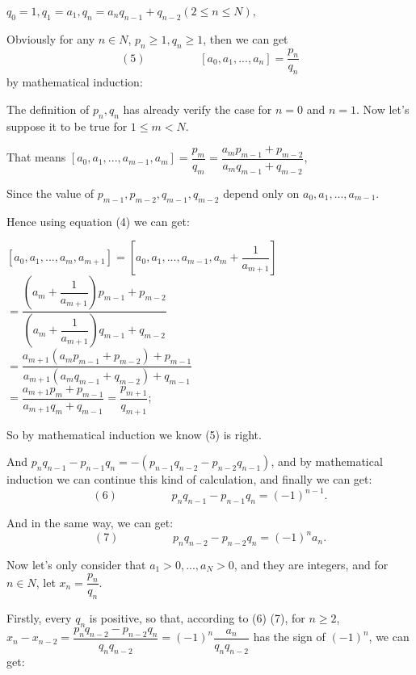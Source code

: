 \documentclass[12pt]{article}
\begin{document}
$q_0=1,q_1=a_1, q_n=a_nq_{n-1}+q_{n-2} (2\leq n\leq N),$\\
\par Obviously for any $n\in N$, $p_n\geq1,q_n\geq1$, then we can get
\begin{equation*}
(5)\hspace{2cm}[a_0,a_1,...,a_n]=\dfrac{p_n}{q_n}
\end{equation*}
by mathematical induction:\\
\par The definition of $p_n,q_n$ has already verify the case for $n=0$ and $n=1$. Now let's suppose it to be true for $1\leq m< N$.\\
\par That means $[a_0,a_1,...,a_{m-1},a_m]=\dfrac{p_m}{q_m}=\dfrac{a_mp_{m-1}+p_{m-2}}{a_mq_{m-1}+q_{m-2}}$,\\
\par Since the value of $p_{m-1},p_{m-2},q_{m-1},q_{m-2}$ depend only on $a_0,a_1,...,a_{m-1}$.\\
\par Hence using equation (4) we can get:
\begin{center}
$[a_0,a_1,...,a_m,a_{m+1}]=[a_0,a_1,...,a_{m-1},a_m+\dfrac{1}{a_{m+1}}]$\\
$=\dfrac{(a_m+\dfrac{1}{a_{m+1}})p_{m-1}+p_{m-2}}{(a_m+\dfrac{1}{a_{m+1}})q_{m-1}+q_{m-2}}$\\
$=\dfrac{a_{m+1}(a_mp_{m-1}+p_{m-2})+p_{m-1}}{a_{m+1}(a_mq_{m-1}+q_{m-2})+q_{m-1}}$\\
$=\dfrac{a_{m+1}p_m+p_{m-1}}{a_{m+1}q_m+q_{m-1}}=\dfrac{p_{m+1}}{q_{m+1}};$\\
\end{center}
So by mathematical induction we know (5) is right.

\par And $p_nq_{n-1}-p_{n-1}q_n=-(p_{n-1}q_{n-2}-p_{n-2}q_{n-1})$, and by mathematical induction we can continue this kind of calculation, and finally we can get:
\begin{equation*}
(6)\hspace{2cm}p_nq_{n-1}-p_{n-1}q_n=(-1)^{n-1}.
\end{equation*}
\par And in the same way, we can get:
\begin{equation*}
(7)\hspace{2cm}p_nq_{n-2}-p_{n-2}q_n=(-1)^na_n.
\end{equation*}
\par Now let's only consider that $a_1>0,...,a_N>0$, and they are integers, and for $n\in N$, let $x_n=\dfrac{p_n}{q_n}$.
\par Firstly, every $q_n$ is positive, so that, according to (6) (7), for $n\geq2$,\\ $x_n-x_{n-2}=\dfrac{p_nq_{n-2}-p_{n-2}q_n}{q_nq_{n-2}}=(-1)^n\dfrac{a_n}{q_nq_{n-2}}$ has the sign of $(-1)^n$, we can get:\\
\end{document}
